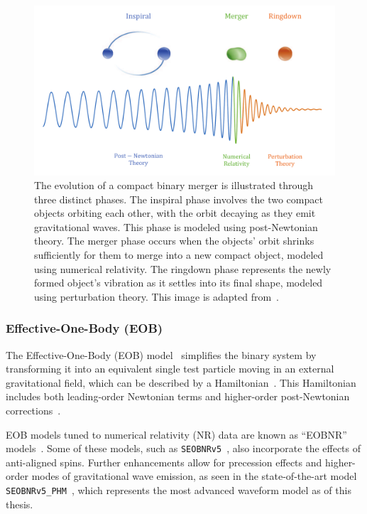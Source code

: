 \begin{figure}
    \centering
    \includegraphics[width=1.0\linewidth]{images/1_general_relativity/modelling_cbc/IMR.pdf}
    \caption{The evolution of a compact binary merger is illustrated through three distinct phases. The inspiral phase involves the two compact objects orbiting each other, with the orbit decaying as they emit gravitational waves. This phase is modeled using post-Newtonian theory. The merger phase occurs when the objects' orbit shrinks sufficiently for them to merge into a new compact object, modeled using numerical relativity. The ringdown phase represents the newly formed object's vibration as it settles into its final shape, modeled using perturbation theory. This image is adapted from~\cite{IMR_plot:2016}.}
    \label{1:fig:IMR}
\end{figure}

\subsubsection{Effective-One-Body (EOB)}

The Effective-One-Body (EOB) model~\cite{EOB_1:1998} simplifies the binary system by transforming it into an equivalent single test particle moving in an external gravitational field, which can be described by a Hamiltonian~\cite{EOB_1:1998, EOB_2:2000, EOB_3:2000, EOB_4:2001}. This Hamiltonian includes both leading-order Newtonian terms and higher-order post-Newtonian corrections~\cite{EOB_5:2008}.

EOB models tuned to numerical relativity (NR) data are known as ``EOBNR'' models~\cite{EOB_6:2007}. Some of these models, such as \verb|SEOBNRv5|~\cite{SEOBNRv5:2023tna}, also incorporate the effects of anti-aligned spins. Further enhancements allow for precession effects and higher-order modes of gravitational wave emission, as seen in the state-of-the-art model \verb|SEOBNRv5_PHM|~\cite{SEOBNRv5_PHM-Buades:2023ehm}, which represents the most advanced waveform model as of this thesis.

